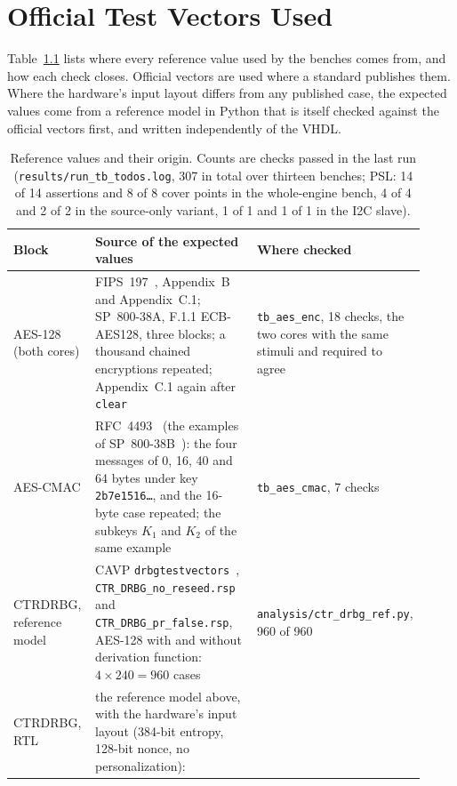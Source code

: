 \chapter{Official Test Vectors Used}
\label{app:vectors}

Table~\ref{tab:app_vectors} lists where every reference value used by the
benches comes from, and how each check closes. Official vectors are used
where a standard publishes them. Where the hardware's input layout
differs from any published case, the expected values come from a
reference model in Python that is itself checked against the official
vectors first, and written independently of the \ac{VHDL}.

\begin{table}[htbp]
\centering\small
\caption{Reference values and their origin. Counts are checks passed in
the last run (\nolinkurl{results/run_tb_todos.log}, 307 in total over
thirteen benches; \acs{PSL}: 14 of 14 assertions and 8 of 8 cover points
in the whole-engine bench, 4 of 4 and 2 of 2 in the source-only variant,
1 of 1 and 1 of 1 in the \acs{I2C} slave).}
\label{tab:app_vectors}
\footnotesize
\begin{tabular}{@{}>{\raggedright\arraybackslash}p{0.2\linewidth}>{\raggedright\arraybackslash}p{0.4\linewidth}>{\raggedright\arraybackslash}p{0.32\linewidth}@{}}
\toprule
Block & Source of the expected values & Where checked \\
\midrule
\ac{AES}-128 (both cores) & FIPS~197~\cite{nist_2023_fips197},
  Appendix~B and Appendix~C.1; SP~800-38A, F.1.1 ECB-AES128, three
  blocks; a thousand chained encryptions repeated; Appendix~C.1 again
  after \texttt{clear} & \texttt{tb\_aes\_enc}, 18 checks, the two cores
  with the same stimuli and required to agree \\
\ac{AES}-\ac{CMAC} & RFC~4493~\cite{song_2006_rfc4493} (the examples of
  SP~800-38B~\cite{nist_2016_sp80038b}): the four messages of 0, 16, 40
  and 64 bytes under key \texttt{2b7e1516\ldots}, and the 16-byte case
  repeated; the subkeys $K_1$ and $K_2$ of the same example & \texttt{tb\_aes\_cmac}, 7 checks \\
\ac{CTRDRBG}, reference model &
  \ac{CAVP} \texttt{drbgtestvectors}~\cite{nist_cavp_drbg},
  \texttt{CTR\_DRBG\_no\_reseed.rsp} and \texttt{CTR\_DRBG\_pr\_false.rsp},
  AES-128 with and without derivation function: $4 \times 240 = 960$ cases &
  \nolinkurl{analysis/ctr_drbg_ref.py}, 960 of 960 \\
\ac{CTRDRBG}, \ac{RTL} & the reference model above, with the hardware's
  input layout (384-bit entropy, 128-bit nonce, no personalization):

\end{tabular}
\end{table}
